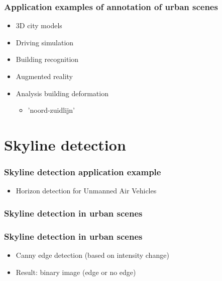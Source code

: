 \documentclass{beamer}
\begin{document}
\frame
{
}
\frame
{
}

\frame
{
	\frametitle{Application examples of annotation of urban scenes}
	\begin{itemize}
	\item 3D city models
	\item Driving simulation
	\item Building recognition
	\item Augmented reality
	\item <+-| alert@+> Analysis building deformation
		\begin{itemize}
		\item <+-| alert@+> 	'noord-zuidlijn'
		\end{itemize}
	\end{itemize}
}

\section{Skyline detection}
\frame
{
	\frametitle{Skyline detection application example}
	\begin{itemize}
		\item <+-| alert@+> Horizon detection for Unmanned Air Vehicles
	\end{itemize}
}

\frame
{
	\frametitle{Skyline detection in urban scenes}%
}
\frame
{
	\frametitle{Skyline detection in urban scenes}%
	\begin{itemize}
		\item <+-| alert@+> Canny edge detection (based on intensity change)
		\item <+-| alert@+> Result: binary image (edge or no edge)

	\end{itemize}
}
\end{document}
